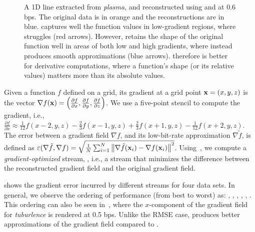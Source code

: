 \begin{figure}[h]
\centering
{} 
\caption{A 1D line extracted from \emph{plasma}, and reconstructed using \sbit and \swav at 0.6 bps.
The original data is in orange and the reconstructions are in blue. \swav captures well the function
values in low-gradient regions, where \sbit struggles (red arrows). However, \sbit retains the shape
of the original function well in areas of both low and high gradients, where \swav instead produces
smooth approximations (blue arrows). \sbit therefore is better for derivative computations, where a
function's shape (or its relative values) matters more than its absolute values.}
\label{fig:bit-plane-vs-wavelet-norm-gradient}
\end{figure}

Given a function $f$ defined on a grid, its gradient at a grid point \mbox{$\x = (x,y,z)$} is the
vector $\nabla f(\x) = \left(\frac{\partial f}{\partial x}, \frac{\partial f}{\partial y},
\frac{\partial f}{\partial z}\right)$. We use a five-point stencil to compute the gradient, i.e.,
$\frac{\partial f}{\partial x} \approx \frac{1}{12}f(x-2,y,z) - \frac{2}{3}f(x-1,y,z) +
\frac{2}{3}f(x+1,y,z) - \frac{1}{12}f(x+2,y,z)$. The error between a gradient field $\nabla f$, and
its low-bit-rate approximation $\nabla
\tilde{f}$, is defined as $\err(\nabla \tilde{f}, \nabla f) = \sqrt{\frac{1}{N}
\sum_{i=1}^{N}{\norm{\nabla \tilde{f}(\x_i)-\nabla f(\x_i)}^2}}$. Using~, we
compute a \emph{gradient-optimized} stream, \sgop, i.e., a stream that minimizes the difference
between the reconstructed gradient field and the original gradient field.

 shows the gradient error incurred by different streams for four
data sets. In general, we observe the ordering of performance (from best to worst) as: \sgop, \sgsg,
\sbit, \swav, \smag, \slvl. This ordering can also be seen in~,
where the $x$-component of the gradient field for \emph{tuburlence} is rendered at 0.5 bps. Unlike
the RMSE case, \sbit produces better approximations of the gradient field compared to \swav.

